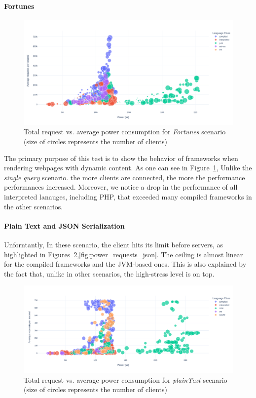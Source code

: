 \paragraph{Fortunes}
\begin{figure}[!h]
    \centering
    \includegraphics[width=\textwidth,height=\textheight,keepaspectratio]{imgs/power_requests_fortune}
    \caption{Total request vs. average power consumption for \emph{Fortunes}  scenario (size of circles represents the number of clients)}
    \label{fig:power_requests_fortunes}
\end{figure}
The primary purpose of this test is to show the behavior of frameworks when rendering webpages with dynamic content.
As one can see in Figure~\ref{fig:power_requests_fortunes}, Unlike the \emph{single query} scenario. the more clients are connected, the more the performance performances increased. Moreover, we notice a drop in the performance of all interpreted lanauges, including PHP, that exceeded many compiled frameworks in the other scenarios.

\paragraph{Plain Text and JSON Serialization}
Unforntantly, In these scenario, the client hits its limit before servers, as highlighted in Figures~\ref{fig:power_requests_plaintext},\ref{fig:power_requests_json}.
The ceiling is almost linear for the compiled frameworks and the JVM-based ones.
This is also explained by the fact that, unlike in other scenarios, the high-stress level is on top.
\begin{figure}[!h]
    \centering
    \includegraphics[width=\textwidth,height=\textheight,keepaspectratio]{imgs/power_requests_plaintext}
    \caption{Total request vs. average power consumption for \emph{plainText} scenario (size of circles represents the number of clients)}
    \label{fig:power_requests_plaintext}
\end{figure}

